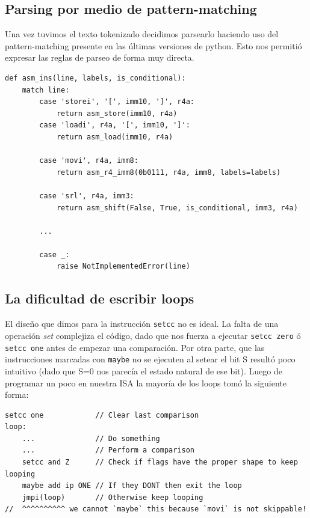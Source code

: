 \documentclass{article}
\begin{document}
\subsection{Parsing por medio de pattern-matching}
Una vez tuvimos el texto tokenizado decidimos parsearlo haciendo uso del pattern-matching presente en las últimas versiones de python. Esto nos permitió expresar las reglas de parseo de forma muy directa.
\begin{verbatim}
def asm_ins(line, labels, is_conditional):
    match line:
        case 'storei', '[', imm10, ']', r4a:
            return asm_store(imm10, r4a)
        case 'loadi', r4a, '[', imm10, ']':
            return asm_load(imm10, r4a)
    
        case 'movi', r4a, imm8: 
            return asm_r4_imm8(0b0111, r4a, imm8, labels=labels)
    
        case 'srl', r4a, imm3: 
            return asm_shift(False, True, is_conditional, imm3, r4a)

        ...
        
        case _:
            raise NotImplementedError(line)
\end{verbatim}

\subsection{La dificultad de escribir loops}
El diseño que dimos para la instrucción \texttt{setcc} no es ideal. La falta de una operación \emph{set} complejiza el código, dado que nos fuerza a ejecutar \texttt{setcc zero} ó \texttt{setcc one} antes de empezar una comparación. Por otra parte, que las instrucciones marcadas con \texttt{maybe} no se ejecuten al setear el bit S resultó poco intuitivo (dado que S=0 nos parecía el estado natural de ese bit). Luego de programar un poco en nuestra ISA la mayoría de los loops tomó la siguiente forma:
\begin{verbatim}
setcc one            // Clear last comparison
loop:
    ...              // Do something
    ...              // Perform a comparison
    setcc and Z      // Check if flags have the proper shape to keep looping
    maybe add ip ONE // If they DONT then exit the loop
    jmpi(loop)       // Otherwise keep looping
//  ^^^^^^^^^^ we cannot `maybe` this because `movi` is not skippable!
\end{verbatim}
\end{document}
